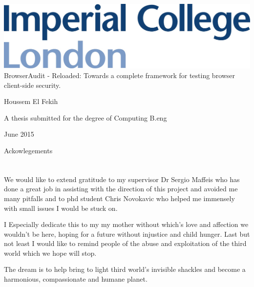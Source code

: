 \documentclass[a4paper,12pt]{report}
\begin{document}
\thispagestyle{empty}
\begin{center}
\begin{minipage}{0.75\linewidth}
    \centering
    \includegraphics[width=1\linewidth]{logo.jpg}
    \vspace{5cm}
    {\Large BrowserAudit - Reloaded: Towards a complete framework for testing browser client-side security.}
    \vspace{3cm}
    {\Large Houssem El Fekih\par}
    \vspace{3cm}
    {\Large A thesis submitted for the degree of Computing B.eng\par}
    \vspace{3cm}
    {\Large June 2015}
\end{minipage}
\end{center}

\begin{textt}
 {\Large Ackowlegements }\\
 \\\\
 We would like to extend gratitude to my supervisor Dr Sergio Maffeis who has done a great job in assisting 
 with the direction of this project and avoided me many pitfalls and to phd student Chris Novokavic who helped me immensely with small issues I would be stuck on.
 
 I Especially dedicate this to my my  mother without which's love and affection we wouldn't be here, hoping for a future without injustice and child hunger.
 Last but not least I would like to remind people of the abuse and exploitation of the third world which we hope will stop.
 
 The dream is to help bring to light third world's invisible shackles and become a harmonious, compassionate and humane planet.
\end{textt}


\clearpage
\end{document}
